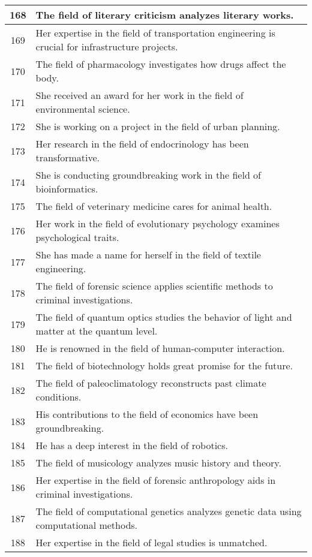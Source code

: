 \begin{longtable}{|c|p{12cm}|}
168 & The field of literary criticism analyzes literary works. \\ \hline
169 & Her expertise in the field of transportation engineering is crucial for infrastructure projects. \\ \hline
170 & The field of pharmacology investigates how drugs affect the body. \\ \hline
171 & She received an award for her work in the field of environmental science. \\ \hline
172 & She is working on a project in the field of urban planning. \\ \hline
173 & Her research in the field of endocrinology has been transformative. \\ \hline
174 & She is conducting groundbreaking work in the field of bioinformatics. \\ \hline
175 & The field of veterinary medicine cares for animal health. \\ \hline
176 & Her work in the field of evolutionary psychology examines psychological traits. \\ \hline
177 & She has made a name for herself in the field of textile engineering. \\ \hline
178 & The field of forensic science applies scientific methods to criminal investigations. \\ \hline
179 & The field of quantum optics studies the behavior of light and matter at the quantum level. \\ \hline
180 & He is renowned in the field of human-computer interaction. \\ \hline
181 & The field of biotechnology holds great promise for the future. \\ \hline
182 & The field of paleoclimatology reconstructs past climate conditions. \\ \hline
183 & His contributions to the field of economics have been groundbreaking. \\ \hline
184 & He has a deep interest in the field of robotics. \\ \hline
185 & The field of musicology analyzes music history and theory. \\ \hline
186 & Her expertise in the field of forensic anthropology aids in criminal investigations. \\ \hline
187 & The field of computational genetics analyzes genetic data using computational methods. \\ \hline
188 & Her expertise in the field of legal studies is unmatched. \\ \hline

\end{longtable}
